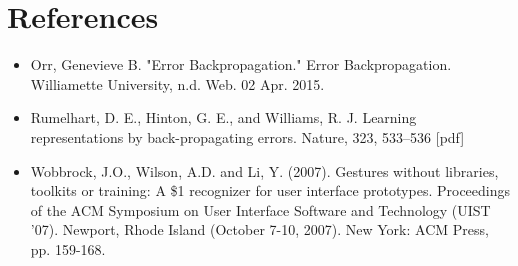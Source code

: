 \documentclass{report}
\begin{document}

\section{References}
\begin{itemize}
\item Orr, Genevieve B. "Error Backpropagation." Error Backpropagation. Williamette University, n.d. Web. 02 Apr. 2015.
\item Rumelhart, D. E., Hinton, G. E., and Williams, R. J. Learning representations by back-propagating errors. Nature, 323, 533--536 [pdf]
\item Wobbrock, J.O., Wilson, A.D. and Li, Y. (2007). Gestures without libraries, toolkits or training: A \$1 recognizer for user interface prototypes. Proceedings of the ACM Symposium on User Interface Software and Technology (UIST '07). Newport, Rhode Island (October 7-10, 2007). New York: ACM Press, pp. 159-168.

\end{itemize}
\end{document}
